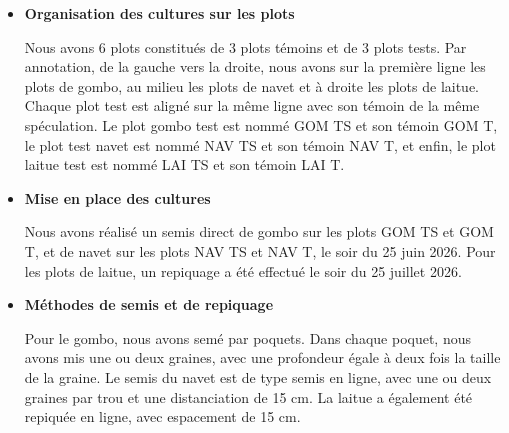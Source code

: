 \begin{itemize}[label=$\bullet$]
   	 \item \textbf{Organisation des cultures sur les plots}

     Nous avons 6 plots constitués de 3 plots témoins et de 3 plots tests. Par annotation, de la gauche vers la droite, nous avons sur la première ligne les plots de gombo, au milieu les plots de navet et à droite les plots de laitue. Chaque plot test est aligné sur la même ligne avec son témoin de la même spéculation. Le plot gombo test est nommé GOM TS et son témoin GOM T, le plot test navet est nommé NAV TS et son témoin NAV T, et enfin, le plot laitue test est nommé LAI TS et son témoin LAI T.
	\end{itemize}
\begin{itemize}[label=$\bullet$]
   	 \item \textbf{Mise en place des cultures}

     Nous avons réalisé un semis direct de gombo sur les plots GOM TS et GOM T, et de navet sur les plots NAV TS et NAV T, le soir du 25 juin 2026. Pour les plots de laitue, un repiquage a été effectué le soir du 25 juillet 2026.
	\end{itemize}

\begin{itemize}[label=$\bullet$]
   	 \item \textbf{Méthodes de semis et de repiquage}

     Pour le gombo, nous avons semé par poquets. Dans chaque poquet, nous avons mis une ou deux graines, avec une profondeur égale à deux fois la taille de la graine. Le semis du navet est de type semis en ligne, avec une ou deux graines par trou et une distanciation de 15 cm. La laitue a également été repiquée en ligne, avec espacement de 15 cm.
	\end{itemize}





